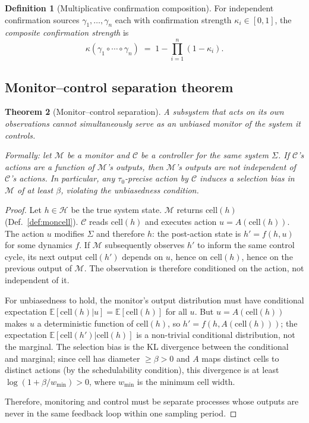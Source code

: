 \documentclass[11pt,twocolumn,a4paper]{article}
\theoremstyle{plain}
\newtheorem{theorem}{Theorem}[section]
\theoremstyle{definition}
\newtheorem{definition}[theorem]{Definition}
\theoremstyle{remark}
\newcommand{\H}{\mathcal{H}}
\newcommand{\tick}{\tau_0}
\newcommand{\floor}{\beta}
\newcommand{\cell}{\mathrm{cell}}
\newcommand{\kap}{\kappa}
\begin{document}
\begin{definition}[Multiplicative confirmation composition]
\label{def:multconf}
For independent confirmation sources $\gamma_1, \ldots, \gamma_n$ each with confirmation strength $\kap_i \in [0,1]$, the \emph{composite confirmation strength} is
\[
  \kap(\gamma_1 \circ \cdots \circ \gamma_n) \;=\; 1 - \prod_{i=1}^n (1 - \kap_i).
\]
\end{definition}

\subsection{Monitor--control separation theorem}

\begin{theorem}[Monitor--control separation]
\label{thm:separation}
A subsystem that acts on its own observations cannot simultaneously serve as an unbiased monitor of the system it controls.

Formally: let $\mathcal{M}$ be a monitor and $\mathcal{C}$ be a controller for the same system $\Sigma$. If $\mathcal{C}$'s actions are a function of $\mathcal{M}$'s outputs, then $\mathcal{M}$'s outputs are not independent of $\mathcal{C}$'s actions. In particular, any $\tick$-precise action by $\mathcal{C}$ induces a selection bias in $\mathcal{M}$ of at least $\floor$, violating the unbiasedness condition.
\end{theorem}

\begin{proof}
Let $h \in \H$ be the true system state. $\mathcal{M}$ returns $\cell(h)$ (Def.~\ref{def:moncell}). $\mathcal{C}$ reads $\cell(h)$ and executes action $u = A(\cell(h))$. The action $u$ modifies $\Sigma$ and therefore $h$: the post-action state is $h' = f(h, u)$ for some dynamics $f$. If $\mathcal{M}$ subsequently observes $h'$ to inform the same control cycle, its next output $\cell(h')$ depends on $u$, hence on $\cell(h)$, hence on the previous output of $\mathcal{M}$. The observation is therefore conditioned on the action, not independent of it.

For unbiasedness to hold, the monitor's output distribution must have conditional expectation $\mathbb{E}[\cell(h) | u] = \mathbb{E}[\cell(h)]$ for all $u$. But $u = A(\cell(h))$ makes $u$ a deterministic function of $\cell(h)$, so $h' = f(h, A(\cell(h)))$; the expectation $\mathbb{E}[\cell(h') | \cell(h)]$ is a non-trivial conditional distribution, not the marginal. The selection bias is the KL divergence between the conditional and marginal; since $\cell$ has diameter $\geq \floor > 0$ and $A$ maps distinct cells to distinct actions (by the schedulability condition), this divergence is at least $\log(1 + \floor / w_{\min}) > 0$, where $w_{\min}$ is the minimum cell width.

Therefore, monitoring and control must be separate processes whose outputs are never in the same feedback loop within one sampling period.
\end{proof}
\end{document}
